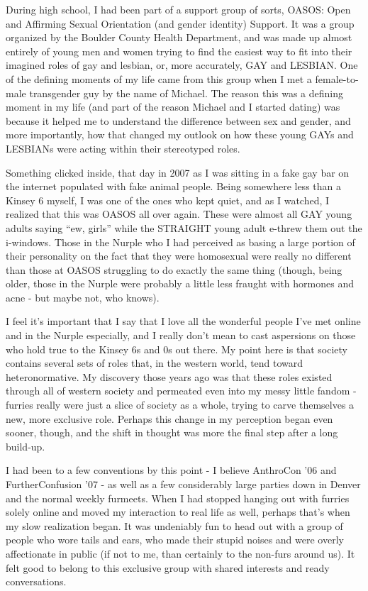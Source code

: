 During high school, I had been part of a support group of sorts, OASOS: Open and Affirming Sexual Orientation (and gender identity) Support. It was a group organized by the Boulder County Health Department, and was made up almost entirely of young men and women trying to find the easiest way to fit into their imagined roles of gay and lesbian, or, more accurately, GAY and LESBIAN. One of the defining moments of my life came from this group when I met a female-to-male transgender guy by the name of Michael. The reason this was a defining moment in my life (and part of the reason Michael and I started dating) was because it helped me to understand the difference between sex and gender, and more importantly, how that changed my outlook on how these young GAYs and LESBIANs were acting within their stereotyped roles.

Something clicked inside, that day in 2007 as I was sitting in a fake gay bar on the internet populated with fake animal people. Being somewhere less than a Kinsey 6 myself, I was one of the ones who kept quiet, and as I watched, I realized that this was OASOS all over again. These were almost all GAY young adults saying ``ew, girls'' while the STRAIGHT young adult e-threw them out the i-windows. Those in the Nurple who I had perceived as basing a large portion of their personality on the fact that they were homosexual were really no different than those at OASOS struggling to do exactly the same thing (though, being older, those in the Nurple were probably a little less fraught with hormones and acne - but maybe not, who knows).

I feel it's important that I say that I love all the wonderful people I've met online and in the Nurple especially, and I really don't mean to cast aspersions on those who hold true to the Kinsey 6s and 0s out there. My point here is that society contains several sets of roles that, in the western world, tend toward heteronormative. My discovery those years ago was that these roles existed through all of western society and permeated even into my messy little fandom - furries really were just a slice of society as a whole, trying to carve themselves a new, more exclusive role. Perhaps this change in my perception began even sooner, though, and the shift in thought was more the final step after a long build-up.

I had been to a few conventions by this point - I believe AnthroCon '06 and FurtherConfusion '07 - as well as a few considerably large parties down in Denver and the normal weekly furmeets. When I had stopped hanging out with furries solely online and moved my interaction to real life as well, perhaps that's when my slow realization began. It was undeniably fun to head out with a group of people who wore tails and ears, who made their stupid noises and were overly affectionate in public (if not to me, than certainly to the non-furs around us). It felt good to belong to this exclusive group with shared interests and ready conversations.

